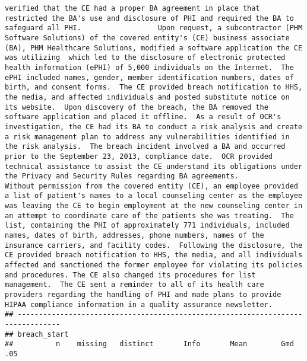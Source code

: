 \documentclass[
]{article}
\begin{document}
\begin{verbatim}
verified that the CE had a proper BA agreement in place that restricted the BA's use and disclosure of PHI and required the BA to safeguard all PHI.                  Upon request, a subcontractor (PHM Software Solutions) of the covered entity's (CE) business associate (BA), PHM Healthcare Solutions, modified a software application the CE was utilizing  which led to the disclosure of electronic protected health information (ePHI) of 5,000 individuals on the Internet.  The ePHI included names, gender, member identification numbers, dates of birth, and consent forms.  The CE provided breach notification to HHS, the media, and affected individuals and posted substitute notice on its website.  Upon discovery of the breach, the BA removed the software application and placed it offline.  As a result of OCR's investigation, the CE had its BA to conduct a risk analysis and create a risk management plan to address any vulnerabilities identified in the risk analysis.  The breach incident involved a BA and occurred prior to the September 23, 2013, compliance date.  OCR provided technical assistance to assist the CE understand its obligations under the Privacy and Security Rules regarding BA agreements.                                                                                                                Without permission from the covered entity (CE), an employee provided a list of patient's names to a local counseling center as the employee was leaving the CE to begin employment at the new counseling center in an attempt to coordinate care of the patients she was treating.  The list, containing the PHI of approximately 771 individuals, included names, dates of birth, addresses, phone numbers, names of the insurance carriers, and facility codes.  Following the disclosure, the CE provided breach notification to HHS, the media, and all individuals affected and sanctioned the former employee for violating its policies and procedures. The CE also changed its procedures for list management.  The CE sent a reminder to all of its health care providers regarding the handling of PHI and made plans to provide HIPAA compliance information in a quality assurance newsletter.                                                                                                                                                                                                                                                                                       
## --------------------------------------------------------------------------------
## breach_start 
##          n    missing   distinct       Info       Mean        Gmd        .05 

\end{verbatim}
\end{document}
